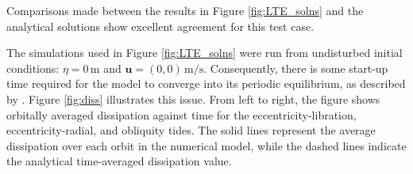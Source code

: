 Comparisons made between the results in Figure \ref{fig:LTE_solns} and the analytical solutions show excellent agreement for this test case.

The simulations used in Figure \ref{fig:LTE_solns} were run from undisturbed initial conditions: \hbox{$\eta = 0 \, \si{\metre}$} and \hbox{$\bm{u} = (0,0) \, \si{\metre\per\second}$}. Consequently, there is some start-up time required for the model to converge into its periodic equilibrium, as described by \citet{sears1995tidal}. Figure \ref{fig:diss} illustrates this issue. From left to right, the figure shows orbitally averaged dissipation against time for the eccentricity-libration, eccentricity-radial, and obliquity tides.  The solid lines represent the average dissipation over each orbit in the numerical model, while the dashed lines indicate the analytical time-averaged dissipation value. 

